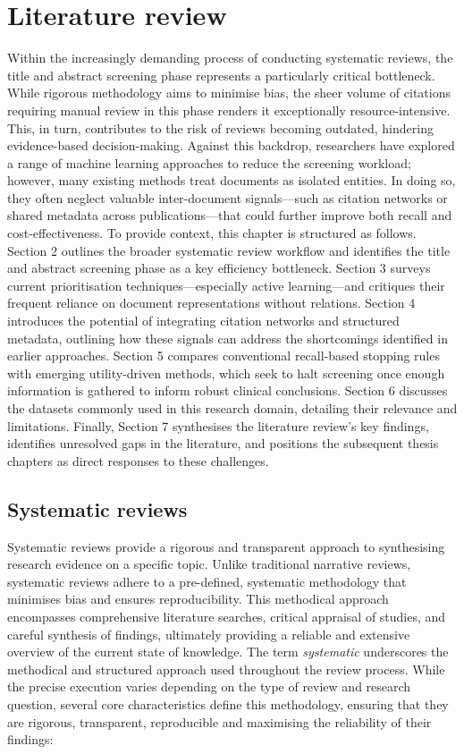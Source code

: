 \documentclass[10pt,oneside]{book}
\begin{document}
\chapter{Literature review}

Within the increasingly demanding process of conducting systematic reviews, the title and abstract screening phase represents a particularly critical bottleneck. While rigorous methodology aims to minimise bias, the sheer volume of citations requiring manual review in this phase renders it exceptionally resource-intensive. This, in turn, contributes to the risk of reviews becoming outdated, hindering evidence-based decision-making. Against this backdrop, researchers have explored a range of machine learning approaches to reduce the screening workload; however, many existing methods treat documents as isolated entities. In doing so, they often neglect valuable inter-document signals—such as citation networks or shared metadata across publications—that could further improve both recall and cost-effectiveness. To provide context, this chapter is structured as follows. Section 2 outlines the broader systematic review workflow and identifies the title and abstract screening phase as a key efficiency bottleneck. Section 3 surveys current prioritisation techniques—especially active learning—and critiques their frequent reliance on document representations without relations. Section 4 introduces the potential of integrating citation networks and structured metadata, outlining how these signals can address the shortcomings identified in earlier approaches. Section 5 compares conventional recall-based stopping rules with emerging utility-driven methods, which seek to halt screening once enough information is gathered to inform robust clinical conclusions. Section 6 discusses the datasets commonly used in this research domain, detailing their relevance and limitations. Finally, Section 7 synthesises the literature review's key findings, identifies unresolved gaps in the literature, and positions the subsequent thesis chapters as direct responses to these challenges.

\section{Systematic reviews}

Systematic reviews provide a rigorous and transparent approach to synthesising research evidence on a specific topic. Unlike traditional narrative reviews, systematic reviews adhere to a pre-defined, systematic methodology that minimises bias and ensures reproducibility. This methodical approach encompasses comprehensive literature searches, critical appraisal of studies, and careful synthesis of findings, ultimately providing a reliable and extensive overview of the current state of knowledge. The term \emph{systematic} underscores the methodical and structured approach used throughout the review process. While the precise execution varies depending on the type of review and research question, several core characteristics define this methodology, ensuring that they are rigorous, transparent, reproducible and maximising the reliability of their findings:
\end{document}
